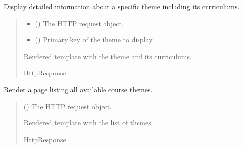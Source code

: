 \documentclass[letterpaper,10pt,english]{sphinxmanual}
\begin{document}
\begin{fulllineitems}
\label{\detokenize{courses:courses.views.theme_detail}}
\pysigstartsignatures
\pysiglinewithargsret
{}
{\sphinxparamcomma {}}
{}
\pysigstopsignatures
\sphinxAtStartPar
Display detailed information about a specific theme including its curriculums.
\begin{quote}\begin{description}
\begin{itemize}
\item {} 
\sphinxAtStartPar
{} () \textendash{} The HTTP request object.

\item {} 
\sphinxAtStartPar
{} () \textendash{} Primary key of the theme to display.

\end{itemize}

\sphinxAtStartPar
Rendered template with the theme and its curriculums.

\sphinxAtStartPar
HttpResponse

\end{description}\end{quote}

\end{fulllineitems}


\begin{fulllineitems}
\label{\detokenize{courses:courses.views.themes_list}}
\pysigstartsignatures
\pysiglinewithargsret
{}
{}
{}
\pysigstopsignatures
\sphinxAtStartPar
Render a page listing all available course themes.
\begin{quote}\begin{description}
\sphinxAtStartPar
{} () \textendash{} The HTTP request object.

\sphinxAtStartPar
Rendered template with the list of themes.

\sphinxAtStartPar
HttpResponse

\end{description}\end{quote}

\end{fulllineitems}
\end{document}
